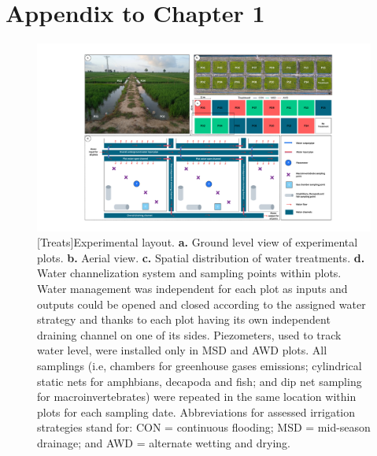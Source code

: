 \section{Appendix to Chapter 1}
\renewcommand{\thefigure}{A.\arabic{figure}}
\setcounter{figure}{0}
\renewcommand{\thetable}{A.\arabic{table}}
\setcounter{table}{0}


\begin{figure}[htbp]
\captionsetup{justification=justified}
	\centering 
	\includegraphics[scale=0.4, center]{Figures/Chapter_1/CERESTRES_layout.pdf}
	[Treats]{Experimental layout. \textbf{a.} Ground level view of experimental plots. \textbf{b.} Aerial view. \textbf{c.} Spatial distribution of water treatments. \textbf{d.} Water channelization system and sampling points within plots. Water management was independent for each plot as inputs and outputs could be opened and closed according to the assigned water strategy and thanks to each plot having its own independent draining channel on one of its sides. Piezometers, used to track water level, were installed only in MSD and AWD plots. All samplings (i.e, chambers for greenhouse gases emissions; cylindrical static nets for amphbians, decapoda and fish; and dip net sampling for macroinvertebrates) were repeated in the same location within plots for each sampling date. Abbreviations for assessed irrigation strategies stand for: CON = continuous flooding; MSD = mid-season drainage; and AWD = alternate wetting and drying.}   
	\label{Exp.lay}
\end{figure}


